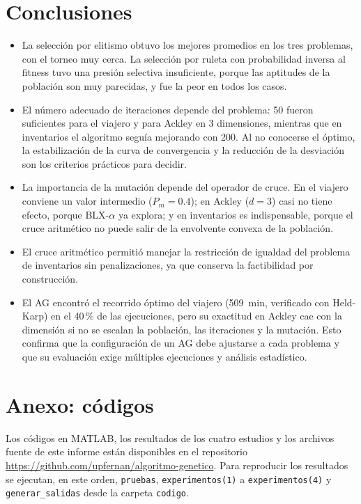 \documentclass[conference]{IEEEtran}
\begin{document}
\section{Conclusiones}
\begin{itemize}
\item La selecci\'on por elitismo obtuvo los mejores promedios en los tres problemas, con el torneo muy cerca. La selecci\'on por ruleta con probabilidad inversa al fitness tuvo una presi\'on selectiva insuficiente, porque las aptitudes de la poblaci\'on son muy parecidas, y fue la peor en todos los casos.
\item El n\'umero adecuado de iteraciones depende del problema: 50 fueron suficientes para el viajero y para Ackley en 3 dimensiones, mientras que en inventarios el algoritmo segu\'ia mejorando con 200. Al no conocerse el \'optimo, la estabilizaci\'on de la curva de convergencia y la reducci\'on de la desviaci\'on son los criterios pr\'acticos para decidir.
\item La importancia de la mutaci\'on depende del operador de cruce. En el viajero conviene un valor intermedio ($P_m=0.4$); en Ackley ($d=3$) casi no tiene efecto, porque BLX-$\alpha$ ya explora; y en inventarios es indispensable, porque el cruce aritm\'etico no puede salir de la envolvente convexa de la poblaci\'on.
\item El cruce aritm\'etico permiti\'o manejar la restricci\'on de igualdad del problema de inventarios sin penalizaciones, ya que conserva la factibilidad por construcci\'on.
\item El AG encontr\'o el recorrido \'optimo del viajero (509~min, verificado con Held-Karp) en el 40\,\% de las ejecuciones, pero su exactitud en Ackley cae con la dimensi\'on si no se escalan la poblaci\'on, las iteraciones y la mutaci\'on. Esto confirma que la configuraci\'on de un AG debe ajustarse a cada problema y que su evaluaci\'on exige m\'ultiples ejecuciones y an\'alisis estad\'istico.
\end{itemize}

\section*{Anexo: c\'odigos}
Los c\'odigos en MATLAB, los resultados de los cuatro estudios y los archivos fuente de este informe est\'an disponibles en el repositorio \url{https://github.com/upfernan/algoritmo-genetico}. Para reproducir los resultados se ejecutan, en este orden, \texttt{pruebas}, \texttt{experimentos(1)} a \texttt{experimentos(4)} y \texttt{generar\_salidas} desde la carpeta \texttt{codigo}.
\end{document}
